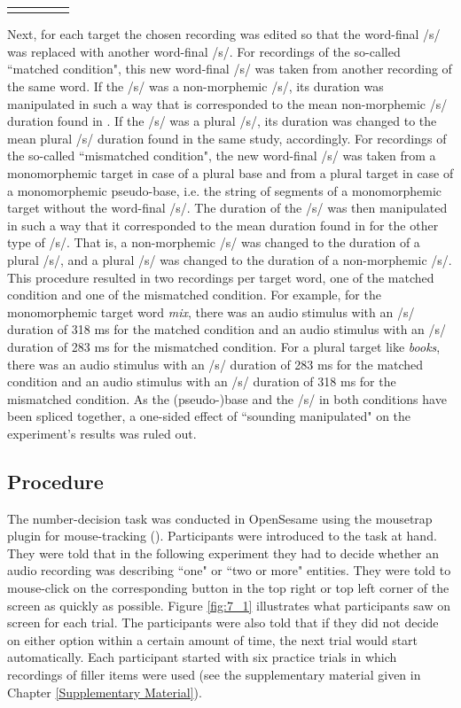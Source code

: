\begin{table}
\begin{tabular}{llccc}
\lspbottomrule
\end{tabular}
\end{table}

Next, for each target the chosen recording was edited so that the word-final /s/ was replaced with another word-final /s/. For recordings of the so-called ``matched condition", this new word-final /s/ was taken from another recording of the same word. If the /s/ was a non-morphemic /s/, its duration was manipulated in such a way that is corresponded to the mean non-morphemic /s/ duration found in \citet{Plag2017}. If the /s/ was a plural /s/, its duration was changed to the mean plural /s/ duration found in the same study, accordingly. For recordings of the so-called ``mismatched condition", the new word-final /s/ was taken from a monomorphemic target in case of a plural base and from a plural target in case of a monomorphemic pseudo-base, i.e. the string of segments of a monomorphemic target without the word-final /s/. The duration of the /s/ was then manipulated in such a way that it corresponded to the mean duration found in \citet{Plag2017} for the other type of /s/. That is, a non-morphemic /s/ was changed to the duration of a plural /s/, and a plural /s/ was changed to the duration of a non-morphemic /s/. This procedure resulted in two recordings per target word, one of the matched condition and one of the mismatched condition. For example, for the monomorphemic target word \textit{mix}, there was an audio stimulus with an /s/ duration of 318 ms for the matched condition and an audio stimulus with an /s/ duration of 283 ms for the mismatched condition. For a plural target like \textit{books}, there was an audio stimulus with an /s/ duration of 283 ms for the matched condition and an audio stimulus with an /s/ duration of 318 ms for the mismatched condition. As the (pseudo-)base and the /s/ in both conditions have been spliced together, a one-sided effect of ``sounding manipulated" on the experiment’s results was ruled out.

\subsection{Procedure}\label{section07_1_3}

The number-decision task was conducted in OpenSesame using the mousetrap plugin for mouse-tracking (\cite{Kieslich2017}). Participants were introduced to the task at hand. They were told that in the following experiment they had to decide whether an audio recording was describing ``one" or ``two or more" entities. They were told to mouse-click on the corresponding button in the top right or top left corner of the screen as quickly as possible. Figure \ref{fig:7_1} illustrates what participants saw on screen for each trial. The participants were also told that if they did not decide on either option within a certain amount of time, the next trial would start automatically. Each participant started with six practice trials in which recordings of filler items were used (see the supplementary material given in Chapter \ref{Supplementary Material}).

